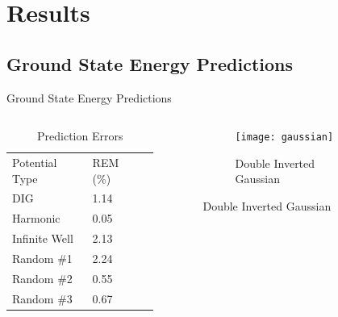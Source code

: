 \documentclass{beamer}
\begin{document}
\section{Results}
\subsection{Ground State Energy Predictions}
\begin{frame}{Ground State Energy Predictions}
\begin{columns}
    \begin{column}{0.4\textwidth}
        \begin{table}[]
            \centering
            \caption{Prediction Errors}
            \begin{tabular}{lll}
            Potential Type & REM (\%) \\
            DIG            & 1.14     \\
            Harmonic       & 0.05     \\
            Infinite Well  & 2.13     \\
            Random \#1     & 2.24     \\
            Random \#2     & 0.55     \\
            Random \#3     & 0.67                    
            \end{tabular} 
        \end{table}
    \end{column}
    \begin{column}{0.8\textwidth}
    \graphicspath{{"../figs/training/"}}
    \begin{figure}[H]
        \begin{subfigure}[t]{0.80\textwidth}
            \texttt{[image: gaussian]}
        \caption{Double Inverted Gaussian}
        \end{subfigure}
    \end{figure}
    \end{column}
\end{columns}
\end{frame}
\end{document}
